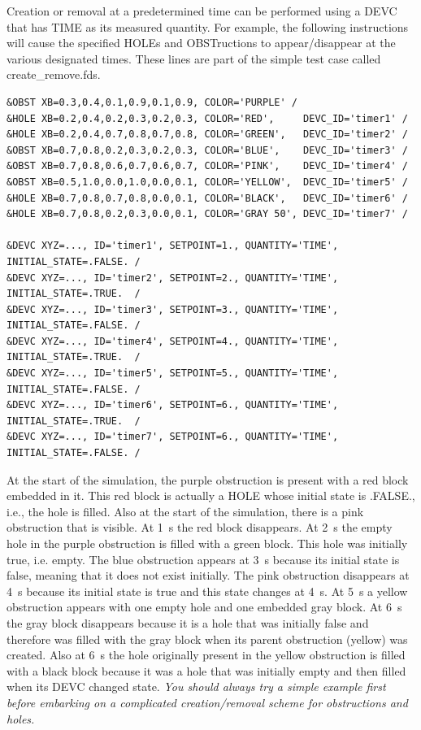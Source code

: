 \documentclass[11pt]{book}
\begin{document}
Creation or removal at a predetermined time can be performed using a {\ct DEVC} that has {\ct TIME} as its measured quantity. For example, the following instructions will cause the specified {\ct HOLE}s and {\ct OBST}ructions to appear/disappear at the various designated times. These lines are part of the simple test case called {\ct create\_remove.fds}.
\begin{lstlisting}
&OBST XB=0.3,0.4,0.1,0.9,0.1,0.9, COLOR='PURPLE' /
&HOLE XB=0.2,0.4,0.2,0.3,0.2,0.3, COLOR='RED',     DEVC_ID='timer1' /
&HOLE XB=0.2,0.4,0.7,0.8,0.7,0.8, COLOR='GREEN',   DEVC_ID='timer2' /
&OBST XB=0.7,0.8,0.2,0.3,0.2,0.3, COLOR='BLUE',    DEVC_ID='timer3' /
&OBST XB=0.7,0.8,0.6,0.7,0.6,0.7, COLOR='PINK',    DEVC_ID='timer4' /
&OBST XB=0.5,1.0,0.0,1.0,0.0,0.1, COLOR='YELLOW',  DEVC_ID='timer5' /
&HOLE XB=0.7,0.8,0.7,0.8,0.0,0.1, COLOR='BLACK',   DEVC_ID='timer6' /
&HOLE XB=0.7,0.8,0.2,0.3,0.0,0.1, COLOR='GRAY 50', DEVC_ID='timer7' /

&DEVC XYZ=..., ID='timer1', SETPOINT=1., QUANTITY='TIME', INITIAL_STATE=.FALSE. /
&DEVC XYZ=..., ID='timer2', SETPOINT=2., QUANTITY='TIME', INITIAL_STATE=.TRUE.  /
&DEVC XYZ=..., ID='timer3', SETPOINT=3., QUANTITY='TIME', INITIAL_STATE=.FALSE. /
&DEVC XYZ=..., ID='timer4', SETPOINT=4., QUANTITY='TIME', INITIAL_STATE=.TRUE.  /
&DEVC XYZ=..., ID='timer5', SETPOINT=5., QUANTITY='TIME', INITIAL_STATE=.FALSE. /
&DEVC XYZ=..., ID='timer6', SETPOINT=6., QUANTITY='TIME', INITIAL_STATE=.TRUE.  /
&DEVC XYZ=..., ID='timer7', SETPOINT=6., QUANTITY='TIME', INITIAL_STATE=.FALSE. /
\end{lstlisting}
At the start of the simulation, the purple obstruction is present with a red block embedded in it. This red block is actually a {\ct HOLE} whose initial state is {\ct .FALSE.}, i.e., the hole is filled. Also at the start of the simulation, there is a pink obstruction that is visible. At 1~s the red block disappears. At 2~s the empty hole in the purple obstruction is filled with a green block. This hole was initially true, i.e. empty.  The blue obstruction appears at 3~s because its initial state is false, meaning that it does not exist initially. The pink obstruction disappears at 4~s because its initial state is true and this state changes at 4~s. At 5~s a yellow obstruction appears with one empty hole and one embedded gray block.  At 6~s the gray block disappears because it is a hole that was initially false and therefore was filled with the gray block when its parent obstruction (yellow) was created.  Also at 6~s the hole originally present in the yellow obstruction is filled with a black block because it was a hole that was initially empty and then filled when its {\ct DEVC} changed state.  {\em You should always try a simple example first before embarking on a complicated creation/removal scheme for obstructions and holes.}
\end{document}
